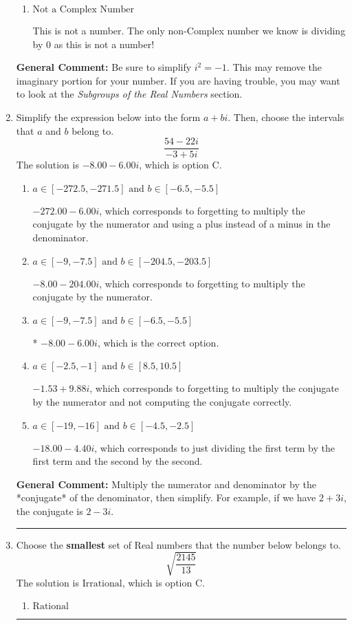 \documentclass{extbook}[14pt]
\newcommand{\litem}[1]{\item #1

\rule{\textwidth}{0.4pt}}
\begin{document}
\begin{enumerate}
{\begin{enumerate}[label=\Alph*.]
* This is the correct option!
\item \( \text{Not a Complex Number} \)

This is not a number. The only non-Complex number we know is dividing by 0 as this is not a number!
\end{enumerate}

\textbf{General Comment:} Be sure to simplify $i^2 = -1$. This may remove the imaginary portion for your number. If you are having trouble, you may want to look at the \textit{Subgroups of the Real Numbers} section.
}
\litem{
Simplify the expression below into the form $a+bi$. Then, choose the intervals that $a$ and $b$ belong to.
\[ \frac{54 - 22 i}{-3 + 5 i} \]
The solution is \( -8.00  - 6.00 i \), which is option C.\begin{enumerate}[label=\Alph*.]
\item \( a \in [-272.5, -271.5] \text{ and } b \in [-6.5, -5.5] \)

 $-272.00  - 6.00 i$, which corresponds to forgetting to multiply the conjugate by the numerator and using a plus instead of a minus in the denominator.
\item \( a \in [-9, -7.5] \text{ and } b \in [-204.5, -203.5] \)

 $-8.00  - 204.00 i$, which corresponds to forgetting to multiply the conjugate by the numerator.
\item \( a \in [-9, -7.5] \text{ and } b \in [-6.5, -5.5] \)

* $-8.00  - 6.00 i$, which is the correct option.
\item \( a \in [-2.5, -1] \text{ and } b \in [8.5, 10.5] \)

 $-1.53  + 9.88 i$, which corresponds to forgetting to multiply the conjugate by the numerator and not computing the conjugate correctly.
\item \( a \in [-19, -16] \text{ and } b \in [-4.5, -2.5] \)

 $-18.00  - 4.40 i$, which corresponds to just dividing the first term by the first term and the second by the second.
\end{enumerate}

\textbf{General Comment:} Multiply the numerator and denominator by the *conjugate* of the denominator, then simplify. For example, if we have $2+3i$, the conjugate is $2-3i$.
}
\litem{
Choose the \textbf{smallest} set of Real numbers that the number below belongs to.
\[ \sqrt{\frac{2145}{13}} \]
The solution is \( \text{Irrational} \), which is option C.\begin{enumerate}[label=\Alph*.]
\item \( \text{Rational} \)


\end{enumerate}}
\end{enumerate}
\end{document}
